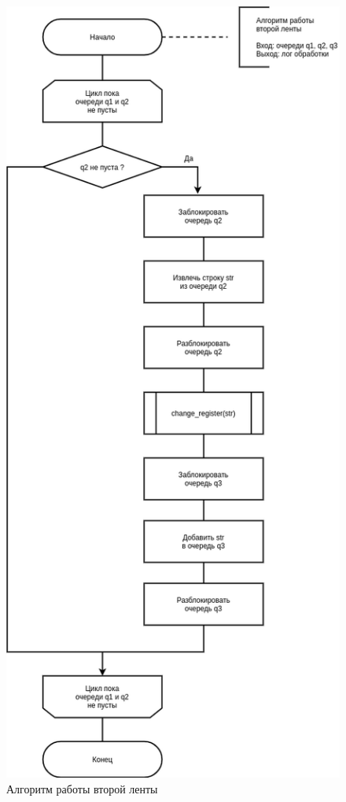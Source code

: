 \begin{figure}[H]
	\begin{center}
		\includegraphics[scale=0.5]{img/second.png}
	\end{center}
	\captionsetup{justification=centering}
	\caption{Алгоритм работы второй ленты}
	\label{img:second}
\end{figure}

